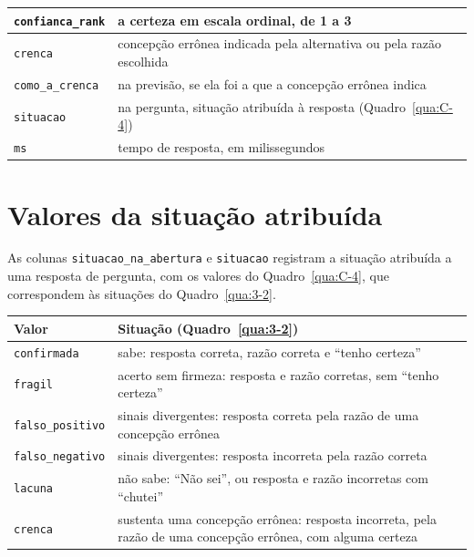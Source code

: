\begin{quadro}[htbp]
\begin{tabularx}{\textwidth}{|X|X|}
\texttt{confianca\_rank} & a certeza em escala ordinal, de 1 a 3 \\ \hline
\texttt{crenca} & concepção errônea indicada pela alternativa ou pela razão escolhida \\ \hline
\texttt{como\_a\_crenca} & na previsão, se ela foi a que a concepção errônea indica \\ \hline
\texttt{situacao} & na pergunta, situação atribuída à resposta (Quadro~\ref{qua:C-4}) \\ \hline
\texttt{ms} & tempo de resposta, em milissegundos \\ \hline
\end{tabularx}
\end{quadro}

\section{Valores da situação atribuída}

As colunas \texttt{situacao\_\allowbreak{}na\_\allowbreak{}abertura} e \texttt{situacao} registram a situação atribuída a uma resposta de pergunta, com os valores do Quadro~\ref{qua:C-4}, que correspondem às situações do Quadro~\ref{qua:3-2}.

\begin{quadro}[htbp]
\caption{Valores da situação atribuída a uma resposta}\label{qua:C-4}
\footnotesize
\begin{tabularx}{\textwidth}{|X|X|}
\hline
\textbf{Valor} & \textbf{Situação (Quadro~\ref{qua:3-2})} \\ \hline
\texttt{confirmada} & sabe: resposta correta, razão correta e ``tenho certeza'' \\ \hline
\texttt{fragil} & acerto sem firmeza: resposta e razão corretas, sem ``tenho certeza'' \\ \hline
\texttt{falso\_positivo} & sinais divergentes: resposta correta pela razão de uma concepção errônea \\ \hline
\texttt{falso\_negativo} & sinais divergentes: resposta incorreta pela razão correta \\ \hline
\texttt{lacuna} & não sabe: ``Não sei'', ou resposta e razão incorretas com ``chutei'' \\ \hline
\texttt{crenca} & sustenta uma concepção errônea: resposta incorreta, pela razão de uma concepção errônea, com alguma certeza \\ \hline
\end{tabularx}
\end{quadro}

